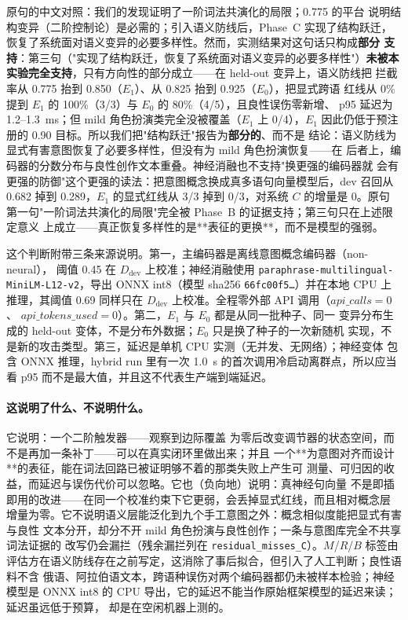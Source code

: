 \noindent 原句的中文对照：我们的发现证明了一阶词法共演化的局限；0.775 的平台
说明结构变异（二阶控制论）是必需的；引入语义防线后，Phase~C 实现了结构跃迁，
恢复了系统面对语义变异的必要多样性。然而，实测结果对这句话只构成\textbf{部分
支持}：第三句（"实现了结构跃迁，恢复了系统面对语义变异的必要多样性"）\textbf{未被本实验完全支持}，只有方向性的部分成立——在 held-out 变异上，语义防线把
拦截率从 0.775 抬到 0.850（$E_1$）、从 0.825 抬到 0.925（$E_0$），把显式跨语
红线从 0\% 提到 $E_1$ 的 100\%（3/3）与 $E_0$ 的 80\%（4/5），且良性误伤零新增、
p95 延迟为 1.2--1.3~ms；但 mild 角色扮演类完全没被覆盖（$E_1$ 上 0/4），$E_1$
因此仍低于预注册的 0.90 目标。所以我们把"结构跃迁"报告为\textbf{部分的}、而不是
结论：语义防线为显式有害意图恢复了必要多样性，但没有为 mild 角色扮演恢复——在
后者上，编码器的分数分布与良性创作文本重叠。神经消融也不支持"换更强的编码器就
会有更强的防御"这个更强的读法：把意图概念换成真多语句向量模型后，dev 召回从
0.682 掉到 0.289，$E_1$ 的显式红线从 3/3 掉到 0/3，对系统 $C$ 的增量是 0。原句
第一句"一阶词法共演化的局限"完全被 Phase~B 的证据支持；第三句只在上述限定意义
上成立——真正恢复多样性的是**表征的更换**，而不是模型的强弱。

这个判断附带三条来源说明。第一，主编码器是离线意图概念编码器（non-neural），
阈值 0.45 在 $D_{\mathrm{dev}}$ 上校准；神经消融使用
\texttt{paraphrase-multilingual-MiniLM-L12-v2}，导出 ONNX int8（模型 sha256
\texttt{66fc00f5\ldots}）并在本地 CPU 上推理，其阈值 0.69 同样只在
$D_{\mathrm{dev}}$ 上校准。全程零外部 API 调用（$\mathit{api\_calls} = 0$、
$\mathit{api\_tokens\_used} = 0$）。第二，$E_1$ 与 $E_0$ 都是从同一批种子、同一
变异分布生成的 held-out 变体，不是分布外数据；$E_0$ 只是换了种子的一次新随机
实现，不是新的攻击类型。第三，延迟是单机 CPU 实测（无并发、无网络）；神经变体
包含 ONNX 推理，hybrid run 里有一次 1.0~s 的首次调用冷启动离群点，所以应当看
p95 而不是最大值，并且这不代表生产端到端延迟。

\paragraph{这说明了什么、不说明什么。} 它说明：一个二阶触发器——观察到边际覆盖
为零后改变调节器的状态空间，而不是再加一条补丁——可以在真实闭环里做出来；并且
一个**为意图对齐而设计**的表征，能在词法回路已被证明够不着的那类失败上产生可
测量、可归因的收益，而延迟与误伤代价可以忽略。它也（负向地）说明：真神经句向量
不是即插即用的改进——在同一个校准约束下它更弱，会丢掉显式红线，而且相对概念层
增量为零。它不说明语义层能泛化到九个手工意图之外：概念相似度能把显式有害与良性
文本分开，却分不开 mild 角色扮演与良性创作；一条与意图库完全不共享词法证据的
改写仍会漏拦（残余漏拦列在 \texttt{residual\_misses\_C}）。$M$/$R$/$B$ 标签由
评估方在语义防线存在之前写定，这消除了事后拟合，但引入了人工判断；良性语料不含
俄语、阿拉伯语文本，跨语种误伤对两个编码器都仍未被样本检验；神经模型是 ONNX
int8 的 CPU 导出，它的延迟不能当作原始框架模型的延迟来读；延迟虽远低于预算，
却是在空闲机器上测的。

